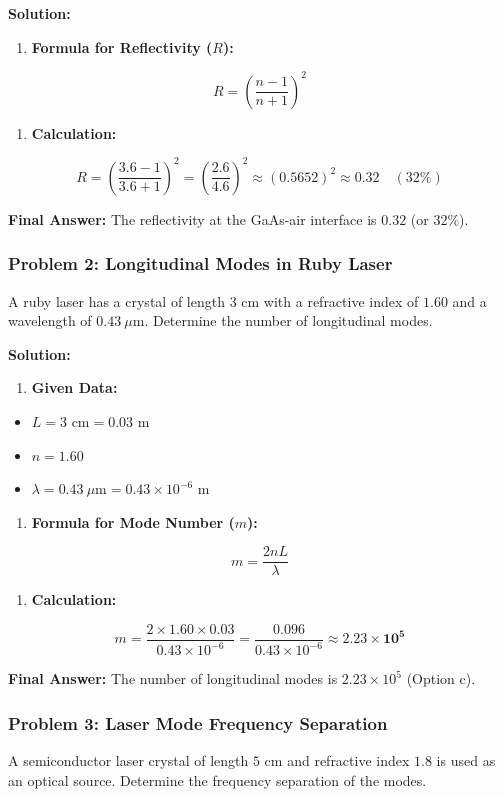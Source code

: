 \textbf{Solution:}
\begin{enumerate}
  \item \textbf{Formula for Reflectivity ($R$):}
\end{enumerate}
    \[ R = \left( \frac{n - 1}{n + 1} \right)^2 \]
\begin{enumerate}
  \item \textbf{Calculation:}
\end{enumerate}
    \[ R = \left( \frac{3.6 - 1}{3.6 + 1} \right)^2 = \left( \frac{2.6}{4.6} \right)^2 \approx (0.5652)^2 \approx \mathbf{0.32} \quad (32\%) \]

\textbf{Final Answer:} The reflectivity at the GaAs-air interface is \textbf{$0.32$} (or \textbf{$32\%$}).


\subsubsection{Problem 2: Longitudinal Modes in Ruby Laser}
A ruby laser has a crystal of length $3\text{ cm}$ with a refractive index of $1.60$ and a wavelength of $0.43\ \mu\text{m}$. Determine the number of longitudinal modes.

\textbf{Solution:}
\begin{enumerate}
  \item \textbf{Given Data:}
\end{enumerate}
\begin{itemize}
  \item   $L = 3\text{ cm} = 0.03\text{ m}$
  \item   $n = 1.60$
  \item   $\lambda = 0.43\ \mu\text{m} = 0.43 \times 10^{-6}\text{ m}$
\end{itemize}
\begin{enumerate}
  \item \textbf{Formula for Mode Number ($m$):}
\end{enumerate}
    \[ m = \frac{2nL}{\lambda} \]
\begin{enumerate}
  \item \textbf{Calculation:}
\end{enumerate}
    \[ m = \frac{2 \times 1.60 \times 0.03}{0.43 \times 10^{-6}} = \frac{0.096}{0.43 \times 10^{-6}} \approx \mathbf{2.23 \times 10^5} \]

\textbf{Final Answer:} The number of longitudinal modes is \textbf{$2.23 \times 10^5$} (Option c).


\subsubsection{Problem 3: Laser Mode Frequency Separation}
A semiconductor laser crystal of length $5\text{ cm}$ and refractive index $1.8$ is used as an optical source. Determine the frequency separation of the modes.

